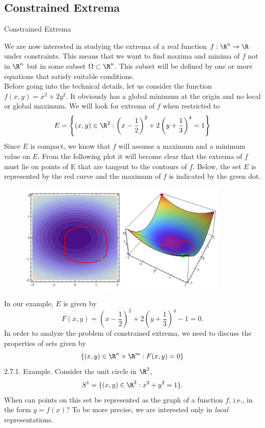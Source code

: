 \documentclass[smaller,hyperref={CJKbookmarks=true}]{beamer}
\begin{document}
\subsection{Constrained Extrema}
\begin{frame}[c]
\begin{spacing}{2.5}
\tableofcontents[sectionstyle=hide,subsectionstyle=show/shaded/hide]
\end{spacing}
\end{frame}
\begin{frame}{Constrained Extrema}
\begin{spacing}{1}
We are now interested in studying the extrema of a real function $f:\R^n\to\R$ under constraints. This means that we want to find maxima and minima of $f$ not in $\R^n$ but in some subset $\Omega\subset\R^n$. This subset will be defined by one or more equations that satisfy suitable conditions.\\[5pt]
Before going into the technical details, let us consider the function $f(x,y)=x^2+2y^2$. It obviously has a global minimum at the origin and no
local or global maximum. We will look for extrema of $f$ when restricted to
\[E=\left\{(x,y)\in\R^2:\left(x-\frac{1}{2}\right)^2
+2\left(y+\frac{1}{3}\right)^4=1\right\}\]
Since $E$ is compact, we know that $f$ will assume a maximum and a
minimum value on $E$. From the following plot it will become clear that the
extrema of $f$ must lie on points of E that are tangent to the contours of $f$.
\newpage
Below, the set $E$ is represented by the red curve and the maximum of $f$ is
indicated by the green dot.
\begin{figure}
  \centering
  \includegraphics[width=0.9\textwidth]{54.jpg}

\end{figure}
\newpage
In our example, $E$ is given by
\[F(x,y)=\left(x-\frac{1}{2}\right)^2+2\left(y+\frac{1}{3}\right)^4
-1=0.\]
In order to analyze the problem of constrained extrema, we need to discuss
the properties of sets given by
\[\{(x,y)\in\R^n\times\R^m:F(x,y)=0\}\]
\alert{2.7.1. Example.} Consider the unit circle in $\R^2$,
\[S^1=\{(x,y)\in\R^2:x^2+y^2=1\}.\]
When can points on this set be represented as the graph of a function $f$,
i.e., in the form $y=f(x)$? To be more precise, we are interested only in \emph{local} representations.
\end{spacing}
\end{frame}
\end{document}
